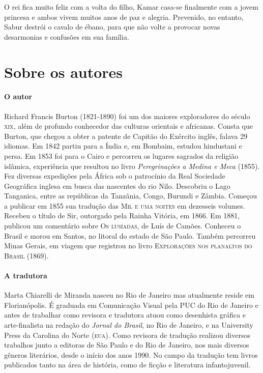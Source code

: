 \documentclass[11pt]{extarticle}
\begin{document}
O rei fica muito feliz com a volta do filho, Kamar casa-se finalmente com a jovem princesa e ambos vivem muitos anos de paz e alegria. Prevenido, no entanto, Sabur destrói o cavalo de ébano, para que não volte a provocar novas desarmonias e confusões em sua família.

\reversemarginpar
\marginparwidth=5cm



\section{Sobre os autores}

\paragraph{O autor} Richard Francis Burton (1821-1890) foi um dos maiores
exploradores do século \textsc{xix}, além de profundo conhecedor das culturas orientais e africanas. Consta que Burton, que chegou a obter a patente de Capitão do Exército inglês, falava 29 idiomas. Em 1842 partiu para a Índia e, em Bombaim, estudou hindustani e persa. Em 1853 foi para o Cairo e percorreu os lugares sagrados da religião islâmica, experiência
que resultou no livro \textit{Peregrinações a Medina e Meca} (1855).
Fez diversas expedições pela África sob o patrocínio da Real Sociedade Geográfica inglesa em busca das nascentes do rio Nilo. Descobriu o Lago Tanganica, entre as repúblicas da
Tanzânia, Congo, Burundi e Zâmbia. Começou a publicar em 1855 sua tradução das \textsc{Mil e uma noites} em dezesseis volumes. Recebeu o título de Sir, outorgado pela Rainha Vitória,
em 1866. Em 1881, publicou um comentário sobre \textsc{Os lusíadas}, de Luís de Camões. Conheceu o Brasil e morou em Santos, no litoral do estado de São Paulo. Também percorreu
Minas Gerais, em viagem que registrou no livro \textsc{Explorações nos planaltos do Brasil} (1869).

\paragraph{A tradutora} Marta Chiarelli de Miranda nasceu no Rio de Janeiro mas
atualmente reside em Florianópolis. É graduada em Comunicação Visual pela \textsc{PUC} do Rio de Janeiro e antes de trabalhar como revisora e tradutora atuou como desenhista gráfica e arte-finalista na redação do \textit{Jornal do Brasil}, no Rio de Janeiro, e na University Press da Carolina do Norte (\textsc{eua}). Como revisora de tradução realizou diversos trabalhos junto a editoras de São Paulo e do Rio de Janeiro, nos mais diversos gêneros literários, desde o início dos anos 1990. No campo da tradução tem livros publicados tanto na área de história, como de ficção e literatura infantojuvenil.
\end{document}
